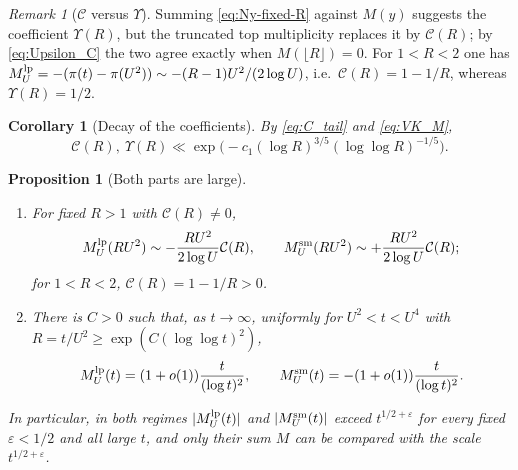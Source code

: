 \documentclass[11pt]{amsart}
\numberwithin{equation}{section}
\theoremstyle{plain}
\newtheorem{proposition}[theorem]{Proposition}
\newtheorem{corollary}[theorem]{Corollary}
\theoremstyle{definition}
\theoremstyle{remark}
\newtheorem{remark}[theorem]{Remark}
\newcommand{\eps}{\varepsilon}
\newcommand{\Cc}{\mathcal{C}}
\begin{document}
\begin{remark}[$\Cc$ versus $\Upsilon$]
\label{rem:C-vs-Upsilon}
Summing \eqref{eq:Ny-fixed-R} against $M(y)$ suggests the coefficient
$\Upsilon(R)$, but the truncated top multiplicity replaces it by $\Cc(R)$; by
\eqref{eq:Upsilon_C} the two agree exactly when $M(\lfloor R\rfloor)=0$. For
$1<R<2$ one has $M^{\rm lp}_U=-(\pi(t)-\pi(U^2))\sim-(R-1)U^2/(2\log U)$, i.e.\
$\Cc(R)=1-1/R$, whereas $\Upsilon(R)=1/2$.
\end{remark}

\begin{corollary}[Decay of the coefficients]
\label{cor:AR-VK}
By \eqref{eq:C_tail} and \eqref{eq:VK_M},
\begin{equation}
\label{eq:AR-VK}
  \Cc(R),\ \Upsilon(R)\ll\exp\bigl(-c_1(\log R)^{3/5}(\log\log R)^{-1/5}\bigr).
\end{equation}
\end{corollary}

\begin{proposition}[Both parts are large]
\label{prop:both_parts_large}
\begin{enumerate}[label=\textup{(\roman*)}]
\item For fixed $R>1$ with $\Cc(R)\ne0$,
\begin{equation}
\label{eq:E_fixed_R_size}
  M^{\rm lp}_U(RU^2)\sim-\frac{RU^2}{2\log U}\Cc(R),\qquad
  M^{\rm sm}_U(RU^2)\sim+\frac{RU^2}{2\log U}\Cc(R);
\end{equation}
for $1<R<2$, $\Cc(R)=1-1/R>0$.
\item There is $C>0$ such that, as $t\to\infty$, uniformly for $U^2<t<U^4$
with $R=t/U^2\ge\exp(C(\log\log t)^2)$,
\begin{equation}
\label{eq:E_log2}
  M^{\rm lp}_U(t)=(1+o(1))\frac{t}{(\log t)^2},\qquad
  M^{\rm sm}_U(t)=-(1+o(1))\frac{t}{(\log t)^2}.
\end{equation}
\end{enumerate}
In particular, in both regimes $|M^{\rm lp}_U(t)|$ and $|M^{\rm sm}_U(t)|$ exceed
$t^{1/2+\eps}$ for every fixed $\eps<1/2$ and all large $t$, and only their
sum $M$ can be compared with the scale $t^{1/2+\eps}$.
\end{proposition}
\end{document}
